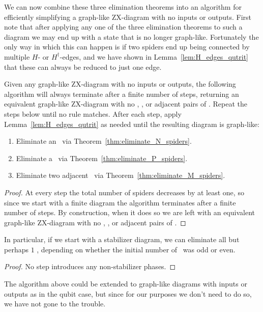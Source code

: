 \documentclass[11pt, oneside]{article}      %
\begin{document}
We can now combine these three elimination theorems into an algorithm for efficiently simplifying a graph-like ZX-diagram with no inputs or outputs. First note that after applying any one of the three elimination theorems to such a diagram we may end up with a state that is no longer graph-like. Fortunately the only way in which this can happen is if two spiders end up being connected by multiple $H$- or $H^\dagger$-edges, and we have shown in Lemma~\ref{lem:H_edges_qutrit} that these can always be reduced to just one edge.

\begin{theorem}\label{thm:simplification_algorithm_works}
	Given any graph-like ZX-diagram with no inputs or outputs, the following algorithm will always terminate after a finite number of steps, returning an equivalent graph-like ZX-diagram with no \Nspiders, \Pspiders, or adjacent pairs of \Mspiders. Repeat the steps below until no rule matches. After each step, apply Lemma~\ref{lem:H_edges_qutrit} as needed until the resulting diagram is graph-like:
	\begin{enumerate}
		\item Eliminate an \Nspider\ via Theorem~\ref{thm:eliminate_N_spiders}.
		\item Eliminate a \Pspider\ via Theorem~\ref{thm:eliminate_P_spiders}.
		\item Eliminate two adjacent \Mspiders\ via Theorem~\ref{thm:eliminate_M_spiders}.
	\end{enumerate}
	\begin{proof}
		At every step the total number of spiders decreases by at least one, so since we start with a finite diagram the algorithm terminates after a finite number of steps. By construction, when it does so we are left with an equivalent graph-like ZX-diagram with no \Nspiders, \Pspiders, or adjacent pairs of \Mspiders.
	\end{proof}
\end{theorem}

\begin{corollary}\label{cor:stabilizer_simplification_algorithm_works}
	In particular, if we start with a stabilizer diagram, we can eliminate all but perhaps $1$ \Mspider, depending on whether the initial number of \Mspiders\ was odd or even. 
	\begin{proof}
		No step introduces any non-stabilizer phases.
	\end{proof}
\end{corollary}

The algorithm above could be extended to graph-like diagrams with inputs or outputs as in the qubit case, but since for our purposes we don't need to do so, we have not gone to the trouble.
\end{document}
